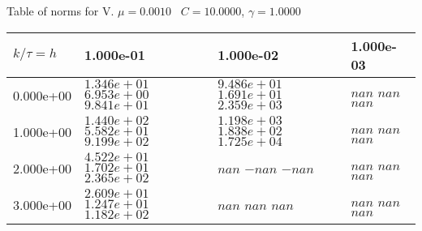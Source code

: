 \begin{center}
Table of norms for V. $\mu = 0.0010$ \, $C = 10.0000$, $\gamma = 1.0000$
  
\begin{tabular}{|p{1in}|p{1in}|p{1in}|p{1in}|} \hline
$k / \tau = h$ &1.000e-01 &1.000e-02 &1.000e-03 \\ \hline 
0.000e+00 & $1.346e+01$  $6.953e+00$  $9.841e+01$  & $9.486e+01$  $1.691e+01$  $2.359e+03$  & $nan$  $nan$  $nan$  \\ \hline 
1.000e+00 & $1.440e+02$  $5.582e+01$  $9.199e+02$  & $1.198e+03$  $1.838e+02$  $1.725e+04$  & $nan$  $nan$  $nan$  \\ \hline 
2.000e+00 & $4.522e+01$  $1.702e+01$  $2.365e+02$  & $nan$  $-nan$  $-nan$  & $nan$  $nan$  $nan$  \\ \hline 
3.000e+00 & $2.609e+01$  $1.247e+01$  $1.182e+02$  & $nan$  $nan$  $nan$  & $nan$  $nan$  $nan$  \\ \hline 

\end{tabular}\\[20pt]
\end{center}
